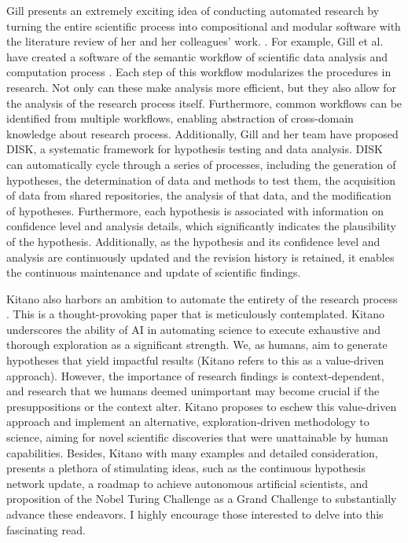\documentclass{book}
\begin{document}
Gill presents an extremely exciting idea of conducting automated research by turning the entire scientific process into compositional and modular software with the literature review of her and her colleagues' work. \cite{gil2022will}. For example, Gill et al. have created a software of the semantic workflow of scientific data analysis and computation process  \cite{gil2011semantic}. 
Each step of this workflow modularizes the procedures in research. Not only can these make analysis more efficient, but they also allow for the analysis of the research process itself. Furthermore, common workflows can be identified from multiple workflows, enabling abstraction of cross-domain knowledge about research process. Additionally, Gill and her team have proposed DISK, a systematic framework for hypothesis testing and data analysis. DISK can automatically cycle through a series of processes, including the generation of hypotheses, the determination of data and methods to test them, the acquisition of data from shared repositories, the analysis of that data, and the modification of hypotheses. Furthermore, each hypothesis is associated with information on confidence level and analysis details, which significantly indicates the plausibility of the hypothesis. Additionally, as the hypothesis and its confidence level and analysis are continuously updated and the revision history is retained, it enables the continuous maintenance and update of scientific findings.

Kitano also harbors an ambition to automate the entirety of the research process \cite{kitano2021nobel}. This is a thought-provoking paper that is meticulously contemplated. Kitano underscores the ability of AI in automating science to execute exhaustive and thorough exploration as a significant strength. We, as humans, aim to generate hypotheses that yield impactful results (Kitano refers to this as a value-driven approach). However, the importance of research findings is context-dependent, and research that we humans deemed unimportant may become crucial if the presuppositions or the context alter. Kitano proposes to eschew this value-driven approach and implement an alternative, exploration-driven methodology to science, aiming for novel scientific discoveries that were unattainable by human capabilities. Besides, Kitano with many examples and detailed consideration, presents a plethora of stimulating ideas, such as the continuous hypothesis network update, a roadmap to achieve autonomous artificial scientists, and proposition of the Nobel Turing Challenge as a Grand Challenge to substantially advance these endeavors. I highly encourage those interested to delve into this fascinating read.
\end{document}
